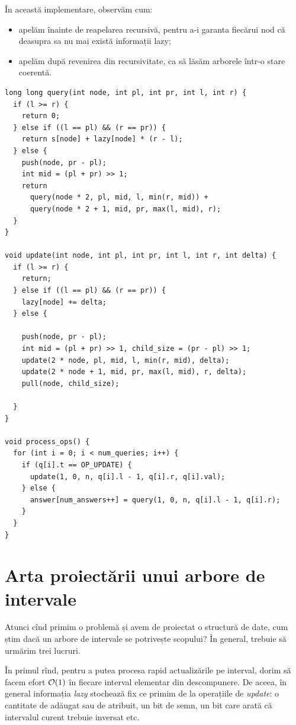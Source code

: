 \documentclass[../main.tex]{subfiles}
\begin{document}
În această implementare, observăm cum:

\begin{itemize}
  \item apelăm  înainte de reapelarea recursivă, pentru a-i garanta fiecărui nod că deasupra sa nu mai există informații lazy;

  \item apelăm  după revenirea din recursivitate, ca să lăsăm arborele într-o stare coerentă.
\end{itemize}

\begin{verbatim}
long long query(int node, int pl, int pr, int l, int r) {
  if (l >= r) {
    return 0;
  } else if ((l == pl) && (r == pr)) {
    return s[node] + lazy[node] * (r - l);
  } else {
    push(node, pr - pl);
    int mid = (pl + pr) >> 1;
    return
      query(node * 2, pl, mid, l, min(r, mid)) +
      query(node * 2 + 1, mid, pr, max(l, mid), r);
  }
}

void update(int node, int pl, int pr, int l, int r, int delta) {
  if (l >= r) {
    return;
  } else if ((l == pl) && (r == pr)) {
    lazy[node] += delta;
  } else {

    push(node, pr - pl);
    int mid = (pl + pr) >> 1, child_size = (pr - pl) >> 1;
    update(2 * node, pl, mid, l, min(r, mid), delta);
    update(2 * node + 1, mid, pr, max(l, mid), r, delta);
    pull(node, child_size);

  }
}

void process_ops() {
  for (int i = 0; i < num_queries; i++) {
    if (q[i].t == OP_UPDATE) {
      update(1, 0, n, q[i].l - 1, q[i].r, q[i].val);
    } else {
      answer[num_answers++] = query(1, 0, n, q[i].l - 1, q[i].r);
    }
  }
}
\end{verbatim}

\section{Arta proiectării unui arbore de intervale}

Atunci cînd primim o problemă și avem de proiectat o structură de date, cum știm dacă un arbore de intervale se potrivește scopului? În general, trebuie să urmărim trei lucruri.

În primul rînd, pentru a putea procesa rapid actualizările pe interval, dorim să facem efort $\mathcal{O}(1)$ în fiecare interval elementar din descompunere. De aceea, în general informația \textit{lazy} stochează fix ce primim de la operațiile de \textit{update}: o cantitate de adăugat sau de atribuit, un bit de semn, un bit care arată că intervalul curent trebuie inversat etc.
\end{document}
